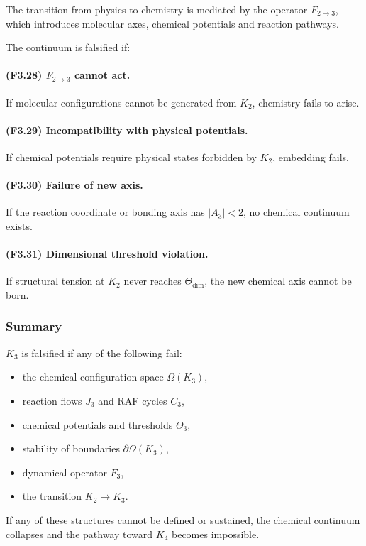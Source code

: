 The transition from physics to chemistry is mediated by the operator
$F_{2\to 3}$, which introduces molecular axes, chemical potentials and
reaction pathways.

The continuum is falsified if:

\paragraph{(F3.28) $F_{2\to 3}$ cannot act.}
If molecular configurations cannot be generated from $K_2$, chemistry
fails to arise.

\paragraph{(F3.29) Incompatibility with physical potentials.}
If chemical potentials require physical states forbidden by $K_2$,
embedding fails.

\paragraph{(F3.30) Failure of new axis.}
If the reaction coordinate or bonding axis has $|A_3| < 2$,
no chemical continuum exists.

\paragraph{(F3.31) Dimensional threshold violation.}
If structural tension at $K_2$ never reaches
$\Theta_{\mathrm{dim}}$, the new chemical axis cannot be born.



\subsubsection{Summary}

$K_3$ is falsified if any of the following fail:

\begin{itemize}
    \item the chemical configuration space $\Omega(K_3)$,
    \item reaction flows $J_3$ and RAF cycles $C_3$,
    \item chemical potentials and thresholds $\Theta_3$,
    \item stability of boundaries $\partial\Omega(K_3)$,
    \item dynamical operator $F_3$,
    \item the transition $K_2\to K_3$.
\end{itemize}

If any of these structures cannot be defined or sustained, the chemical
continuum collapses and the pathway toward $K_4$ becomes impossible.

